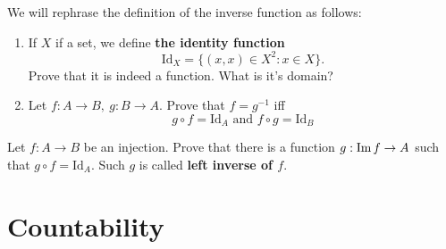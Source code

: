 \begin{prob} We will rephrase the definition of the inverse function as follows:
	\begin{enumerate}
		\item If $X$ if a set, we define \textbf{the identity function}
			$$\text{Id}_X=\{(x,x)\in X^2 : x\in X\}.$$
			Prove that it is indeed a function. What is it's domain?
		\item Let $f:A\to B,~g:B\to A$. Prove that $f=g^{-1}$ iff
			$$g\circ f = \text{Id}_A \text{ and } f\circ g = \text{Id}_B$$
	\end{enumerate}
\end{prob}

\begin{prob}
  Let $f: A\to B$ be an injection. Prove that there is a function
  $g: \text{Im\,} f \to A$ such that $g\circ f = \text{Id}_A.$
  Such $g$ is called \textbf{left inverse of $f$}.
\end{prob}

\section{Countability}
